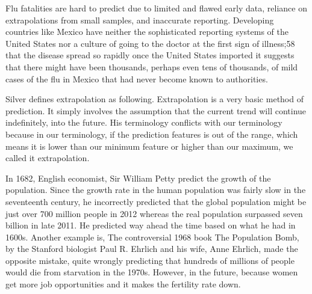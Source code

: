 \documentclass[12pt]{article}
\begin{document}
\begin{enumerate}


Flu fatalities are hard to predict due to limited and flawed early data, reliance on extrapolations from small samples, and inaccurate reporting. Developing countries like Mexico have neither the sophisticated reporting systems of the United States nor a culture of going to the doctor at the first sign of illness;58 that the disease spread so rapidly once the United States imported it suggests that there might have been thousands, perhaps even tens of thousands, of mild cases of the flu in Mexico that had never become known to authorities.


Silver defines extrapolation as following. Extrapolation is a very basic method of prediction. It simply involves the assumption that the current trend will continue indefinitely, into the future. His terminology conflicts with our terminology because in our terminology, if the prediction features is out of the range, which means it is lower than our minimum feature or higher than our maximum, we called it extrapolation. 


In 1682, English economist, Sir William Petty predict the growth of the population. Since the growth rate in the human population was fairly slow in the seventeenth century, he incorrectly predicted that the global population might be just over 700 million people in 2012 whereas the real population surpassed seven billion in late 2011. He predicted way ahead the time based on what he had in 1600s. Another example is, The controversial 1968 book The Population Bomb, by the Stanford biologist Paul R. Ehrlich and his wife, Anne Ehrlich, made the opposite mistake, quite wrongly predicting that hundreds of millions of people would die from starvation in the 1970s. However, in the future, because women get more job opportunities and it makes the fertility rate down.




\end{enumerate}
\end{document}
